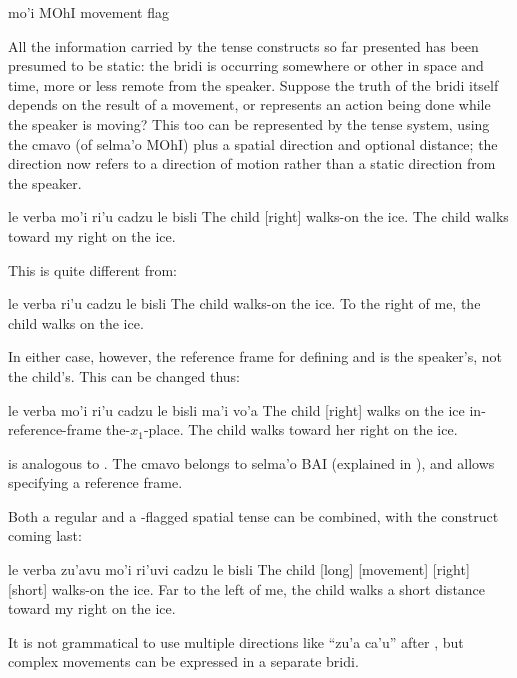    mo'i    MOhI    movement flag

All the information carried by the tense constructs so far
    presented has been presumed to be static: the bridi is
    occurring somewhere or other in space and time, more or less
    remote from the speaker. Suppose the truth of the bridi itself
    depends on the result of a movement, or represents an action
    being done while the speaker is moving? This too can be
    represented by the tense system, using the cmavo  (of
    selma'o MOhI) plus a spatial direction and optional distance;
    the direction now refers to a direction of motion rather than a
    static direction from the speaker.
\begin{example}
le verba mo'i ri'u cadzu le bisli\n
The child  [right] walks-on the ice.\n
The child walks toward my right on the ice.
\end{example}

This is quite different from:
\begin{example}
le verba ri'u cadzu le bisli\n
The child  walks-on the ice.\n
To the right of me, the child walks on the ice.
\end{example}

In either case, however, the reference frame for defining
     and  is the speaker's, not the child's. This
    can be changed thus:
\begin{example}
le verba mo'i ri'u cadzu le bisli\n
\T	ma'i vo'a\n
The child  [right] walks on the ice\n
\T	in-reference-frame the-$x_1$-place.\n
The child walks toward her right on the ice.
\end{example}

 is analogous to . The cmavo  belongs to
    selma'o BAI (explained in ),
    and allows specifying a reference frame. 

Both a regular and a -flagged spatial tense can be
    combined, with the  construct coming last:
\begin{example}
le verba zu'avu mo'i ri'uvi\n
\T	cadzu le bisli\n
The child  [long] [movement] [right] [short]\n
\T	walks-on the ice.\n
Far to the left of me, the child walks a short\n
\T	distance toward my right on the ice.
\end{example}

It is not grammatical to use multiple directions like ``zu'a
    ca'u'' after , but complex movements can be expressed
    in a separate bridi. 

